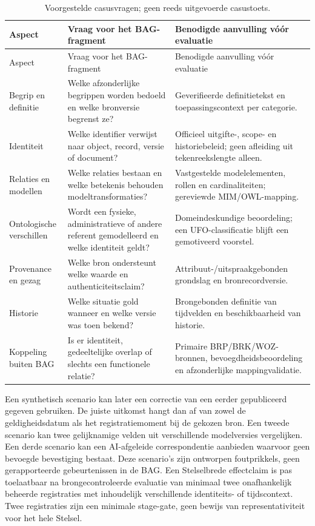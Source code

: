 \begin{longtable}{@{}P{.22\linewidth}P{.40\linewidth}P{.30\linewidth}@{}}
\caption{Voorgestelde casusvragen; geen reeds uitgevoerde casustoets.}\\
\toprule Aspect & Vraag voor het BAG-fragment & Benodigde aanvulling vóór evaluatie \\ \midrule\endfirsthead
\toprule Aspect & Vraag voor het BAG-fragment & Benodigde aanvulling vóór evaluatie \\ \midrule\endhead
Begrip en definitie & Welke afzonderlijke begrippen worden bedoeld en welke bronversie begrenst ze? & Geverifieerde definitietekst en toepassingscontext per categorie. \\
Identiteit & Welke identifier verwijst naar object, record, versie of document? & Officieel uitgifte-, scope- en historiebeleid; geen afleiding uit tekenreekslengte alleen. \\
Relaties en modellen & Welke relaties bestaan en welke betekenis behouden modeltransformaties? & Vastgestelde modelelementen, rollen en cardinaliteiten; gereviewde MIM/OWL-mapping. \\
Ontologische verschillen & Wordt een fysieke, administratieve of andere referent gemodelleerd en welke identiteit geldt? & Domeindeskundige beoordeling; een UFO-classificatie blijft een gemotiveerd voorstel. \\
Provenance en gezag & Welke bron ondersteunt welke waarde en authenticiteitsclaim? & Attribuut-/uitspraakgebonden grondslag en bronrecordversie. \\
Historie & Welke situatie gold wanneer en welke versie was toen bekend? & Brongebonden definitie van tijdvelden en beschikbaarheid van historie. \\
Koppeling buiten BAG & Is er identiteit, gedeeltelijke overlap of slechts een functionele relatie? & Primaire BRP/BRK/WOZ-bronnen, bevoegdheidsbeoordeling en afzonderlijke mappingvalidatie. \\
\bottomrule
\end{longtable}

Een synthetisch scenario kan later een correctie van een eerder gepubliceerd gegeven gebruiken. De juiste uitkomst hangt dan af van zowel de geldigheidsdatum als het registratiemoment bij de gekozen bron. Een tweede scenario kan twee gelijknamige velden uit verschillende modelversies vergelijken. Een derde scenario kan een AI-afgeleide correspondentie aanbieden waarvoor geen bevoegde bevestiging bestaat. Deze scenario’s zijn ontworpen foutprikkels, geen gerapporteerde gebeurtenissen in de BAG. Een Stelselbrede effectclaim is pas toelaatbaar na brongecontroleerde evaluatie van minimaal twee onafhankelijk beheerde registraties met inhoudelijk verschillende identiteits- of tijdscontext. Twee registraties zijn een minimale stage-gate, geen bewijs van representativiteit voor het hele Stelsel.


